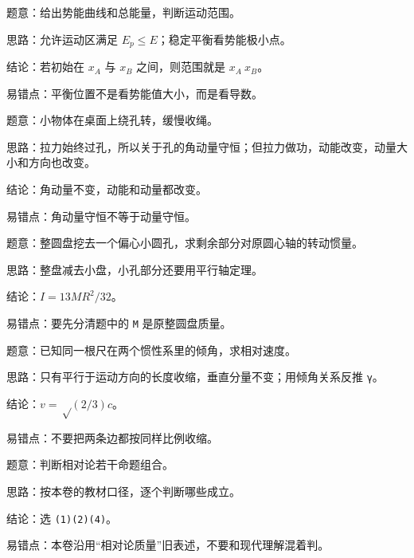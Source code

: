 \documentclass[12pt,a4paper]{ctexart}
\begin{document}
\begin{tcolorbox}[colback=white,colframe=black!55,title={11. 由势能曲线判断运动范围与平衡稳定性}]
题意：给出势能曲线和总能量，判断运动范围。\par
思路：允许运动区满足 \(E_p≤E\)；稳定平衡看势能极小点。\par
结论：若初始在 \(x_A\) 与 \(x_B\) 之间，则范围就是 \(x_A~x_B\)。\par
易错点：平衡位置不是看势能值大小，而是看导数。\par
\end{tcolorbox}

\begin{tcolorbox}[colback=white,colframe=black!55,title={12. 桌面上小物体绕孔转动，缓慢拉绳后哪些量改变}]
题意：小物体在桌面上绕孔转，缓慢收绳。\par
思路：拉力始终过孔，所以关于孔的角动量守恒；但拉力做功，动能改变，动量大小和方向也改变。\par
结论：角动量不变，动能和动量都改变。\par
易错点：角动量守恒不等于动量守恒。\par
\end{tcolorbox}

\begin{tcolorbox}[colback=white,colframe=black!55,title={13. 挖去偏心圆孔后的圆盘，对原圆心轴的转动惯量}]
题意：整圆盘挖去一个偏心小圆孔，求剩余部分对原圆心轴的转动惯量。\par
思路：整盘减去小盘，小孔部分还要用平行轴定理。\par
结论：\(I=13MR^2/32\)。\par
易错点：要先分清题中的 \texttt{M} 是原整圆盘质量。\par
\end{tcolorbox}

\begin{tcolorbox}[colback=white,colframe=black!55,title={14. 相对论尺的倾角变换，求 \texttt{K'} 相对 \texttt{K} 的速度}]
题意：已知同一根尺在两个惯性系里的倾角，求相对速度。\par
思路：只有平行于运动方向的长度收缩，垂直分量不变；用倾角关系反推 \texttt{γ}。\par
结论：\(v=√(2/3)c\)。\par
易错点：不要把两条边都按同样比例收缩。\par
\end{tcolorbox}

\begin{tcolorbox}[colback=white,colframe=black!55,title={15. 狭义相对论四个说法的正误判断}]
题意：判断相对论若干命题组合。\par
思路：按本卷的教材口径，逐个判断哪些成立。\par
结论：选 \texttt{(1)(2)(4)}。\par
易错点：本卷沿用“相对论质量”旧表述，不要和现代理解混着判。\par
\end{tcolorbox}
\end{document}
